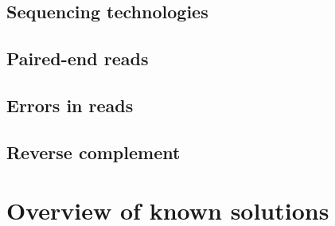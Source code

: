 \subsection{Sequencing technologies}

\subsection{Paired-end reads}

\subsection{Errors in reads}

\subsection{Reverse complement}

\section{Overview of known solutions}


